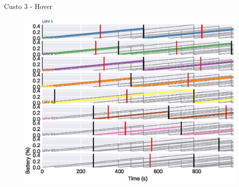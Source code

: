 \begin{frame}{Custo 3 - Hover}
            \begin{figure}[!htb]
                 \includegraphics[width=\textwidth]{custo_3/uav_hover_acum_all.eps}
             \end{figure}
        \end{frame}
